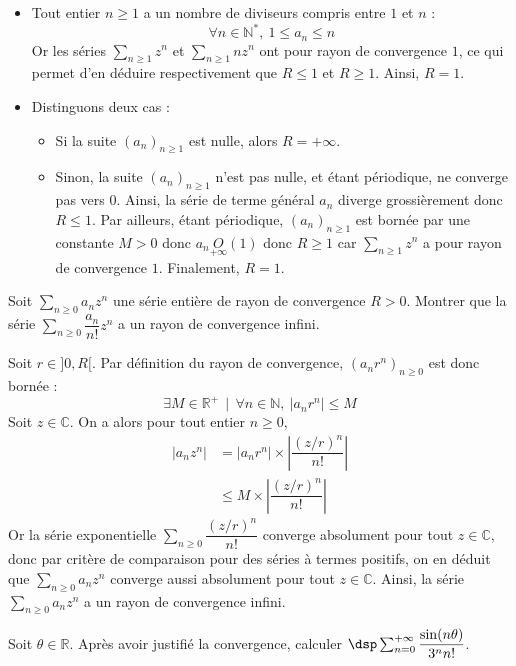 \documentclass[a4paper,10pt]{report}
\newcommand{\Sum}[2]{\ensuremath{\textstyle{\sum\limits_{#1}^{#2}}}}
\begin{document}
\corr 
\begin{itemize}
\item Tout entier $n\geq 1$ a un nombre de diviseurs compris entre $1$ et $n$ :
\[
\forall n\in\mathbb{N}^*,\ 1\leq a_n \leq n
\]
Or les séries $\Sum{n\geq 1}{} z^n$ et $\Sum{n\geq 1}{}n z^n$ ont pour rayon de convergence $1$, ce qui permet d'en déduire respectivement que $R\leq 1$ et $R\geq 1$.  Ainsi, $R=1$.
\item Distinguons deux cas :
\begin{itemize}
\item Si la suite $(a_n)_{n\geq 1}$ est nulle, alors $R=+\infty$.
\item Sinon, la suite $(a_n)_{n\geq 1}$ n'est pas nulle, et étant périodique, ne converge pas vers $0$. Ainsi, la série de terme général $a_n$ diverge grossièrement donc $R\leq 1$. Par ailleurs, étant périodique, $(a_n)_{n\geq 1}$ est bornée par une constante $M>0$ donc $a_n \underset{+ \infty} O(1)$ donc $R \geq 1$ car $\Sum{n\geq 1}{} z^n$ a pour rayon de convergence $1$. Finalement, $R=1$.
\end{itemize}
\end{itemize}

\begin{Exa} Soit $\Sum{n \geq 0}{} a_n z^n$ une série entière de rayon de convergence $R>0$. Montrer que  la série $\Sum{n \geq 0}{} \dfrac{a_n}{n!}z^n$ a un rayon de convergence infini. 
\end{Exa}

\corr Soit $r\in ]0,R[$. Par définition du rayon de convergence, $(a_n r^n)_{n \geq 0}$ est donc bornée : 
\[
\exists M\in\mathbb{R}^+\,\mid\, \forall n\in\mathbb{N},\ \vert a_n r^n\vert \leq M
\]
Soit $z\in\mathbb{C}$. On a alors pour tout entier $n \geq 0$,
\begin{align*}
\vert a_n z^n\vert & =\vert a_n r^n\vert \times \left\vert\dfrac{(z/r)^n}{n!}\right\vert \\
&  \leq M\times \left\vert\dfrac{(z/r)^n}{n!}\right\vert
\end{align*}
Or la série exponentielle $\Sum{n \geq 0}{} \dfrac{(z/r)^n}{n!}$ converge absolument pour tout $z\in\mathbb{C}$, donc par critère de comparaison pour des séries à termes positifs, on en déduit que $\Sum{n \geq 0}{} a_nz^n$ converge aussi absolument pour tout $z\in\mathbb{C}$. Ainsi, la série $\Sum{n \geq 0}{} a_nz^n$ a un rayon de convergence infini.


\begin{Exa} Soit $\theta\in\mathbb{R}$. Après avoir justifié la convergence, calculer $\dsp\sum_{n=0}^{+\infty}\dfrac{\sin(n\theta)}{3^nn!}$.
\end{Exa}
\end{document}
